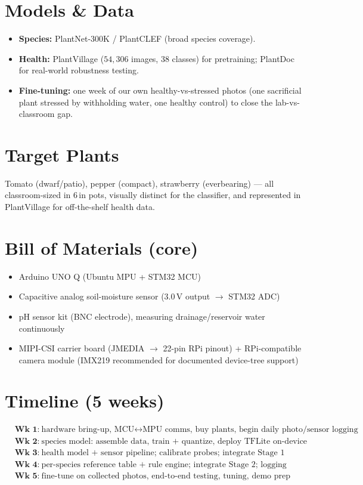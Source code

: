 \documentclass[10pt]{article}
\begin{document}
\section*{Models \& Data}
\begin{itemize}
  \item \textbf{Species:} PlantNet-300K / PlantCLEF (broad species coverage).
  \item \textbf{Health:} PlantVillage ($54{,}306$ images, 38 classes) for pretraining; PlantDoc for
        real-world robustness testing.
  \item \textbf{Fine-tuning:} one week of our own healthy-vs-stressed photos (one sacrificial plant
        stressed by withholding water, one healthy control) to close the lab-vs-classroom gap.
\end{itemize}

\section*{Target Plants}
Tomato (dwarf/patio), pepper (compact), strawberry (everbearing) --- all classroom-sized in 6\,in
pots, visually distinct for the classifier, and represented in PlantVillage for off-the-shelf
health data.

\section*{Bill of Materials (core)}
\begin{itemize}
  \item Arduino UNO Q (Ubuntu MPU + STM32 MCU)
  \item Capacitive analog soil-moisture sensor ($3.0\,\text{V}$ output $\rightarrow$ STM32 ADC)
  \item pH sensor kit (BNC electrode), measuring drainage/reservoir water continuously
  \item MIPI-CSI carrier board (JMEDIA $\rightarrow$ 22-pin RPi pinout) + RPi-compatible camera
        module (IMX219 recommended for documented device-tree support)
\end{itemize}

\section*{Timeline (5 weeks)}
$$\begin{aligned}
&\textbf{Wk 1:}\ \text{hardware bring-up, MCU}\leftrightarrow\text{MPU comms, buy plants, begin daily photo/sensor logging}\\
&\textbf{Wk 2:}\ \text{species model: assemble data, train + quantize, deploy TFLite on-device}\\
&\textbf{Wk 3:}\ \text{health model + sensor pipeline; calibrate probes; integrate Stage 1}\\
&\textbf{Wk 4:}\ \text{per-species reference table + rule engine; integrate Stage 2; logging}\\
&\textbf{Wk 5:}\ \text{fine-tune on collected photos, end-to-end testing, tuning, demo prep}
\end{aligned}$$
\end{document}
